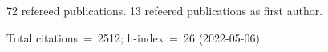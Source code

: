 72 refereed publications. 13 refeered publications as first author.

Total citations~=~2512; h-index~=~26 (2022-05-06)